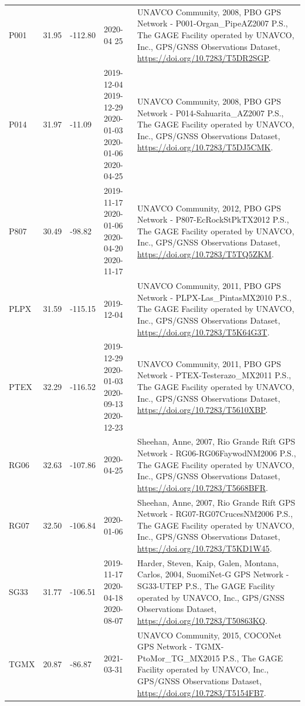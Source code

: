 \begin{landscape}
\begin{longtable}{lllp{4cm}p{10cm}}
    P001 & 31.95 & -112.80 & 2020-04 25 & UNAVCO Community, 2008, PBO GPS Network - P001-Organ\_PipeAZ2007 P.S., The GAGE Facility operated by UNAVCO, Inc., GPS/GNSS Observations Dataset, \url{https://doi.org/10.7283/T5DR2SGP}.\\
    P014 & 31.97 & -11.09 & 2019-12-04 2019-12-29 2020-01-03 2020-01-06 2020-04-25 & UNAVCO Community, 2008, PBO GPS Network - P014-Sahuarita\_AZ2007 P.S., The GAGE Facility operated by UNAVCO, Inc., GPS/GNSS Observations Dataset, \url{https://doi.org/10.7283/T5DJ5CMK}.\\
    P807 & 30.49 & -98.82 & 2019-11-17 2020-01-06 2020-04-20 2020-11-17 & UNAVCO Community, 2012, PBO GPS Network - P807-EcRockStPkTX2012 P.S., The GAGE Facility operated by UNAVCO, Inc., GPS/GNSS Observations Dataset, \url{https://doi.org/10.7283/T5TQ5ZKM}.\\
    PLPX & 31.59 & -115.15 & 2019-12-04 & UNAVCO Community, 2011, PBO GPS Network - PLPX-Las\_PintasMX2010 P.S., The GAGE Facility operated by UNAVCO, Inc., GPS/GNSS Observations Dataset, \url{https://doi.org/10.7283/T5K64G3T}.\\
    PTEX & 32.29 & -116.52 & 2019-12-29 2020-01-03 2020-09-13 2020-12-23 & UNAVCO Community, 2011, PBO GPS Network - PTEX-Testerazo\_MX2011 P.S., The GAGE Facility operated by UNAVCO, Inc., GPS/GNSS Observations Dataset, \url{https://doi.org/10.7283/T5610XBP}.\\
    RG06 & 32.63 & -107.86 & 2020-04-25 & Sheehan, Anne, 2007, Rio Grande Rift GPS Network - RG06-RG06FaywodNM2006 P.S., The GAGE Facility operated by UNAVCO, Inc., GPS/GNSS Observations Dataset, \url{https://doi.org/10.7283/T5668BFR}.\\
    RG07 & 32.50 & -106.84 & 2020-01-06 & Sheehan, Anne, 2007, Rio Grande Rift GPS Network - RG07-RG07CrucesNM2006 P.S., The GAGE Facility operated by UNAVCO, Inc., GPS/GNSS Observations Dataset, \url{https://doi.org/10.7283/T5KD1W45}. \\
    SG33 & 31.77 & -106.51 & 2019-11-17 2020-04-18 2020-08-07 & Harder, Steven, Kaip, Galen, Montana, Carlos, 2004, SuomiNet-G GPS Network - SG33-UTEP P.S., The GAGE Facility operated by UNAVCO, Inc., GPS/GNSS Observations Dataset, \url{https://doi.org/10.7283/T50863KQ}.\\
    TGMX  & 20.87 & -86.87 & 2021-03-31 & UNAVCO Community, 2015, COCONet GPS Network - TGMX-PtoMor\_TG\_MX2015 P.S., The GAGE Facility operated by UNAVCO, Inc., GPS/GNSS Observations Dataset, \url{https://doi.org/10.7283/T5154FB7}.\\

\end{longtable}
\end{landscape}

